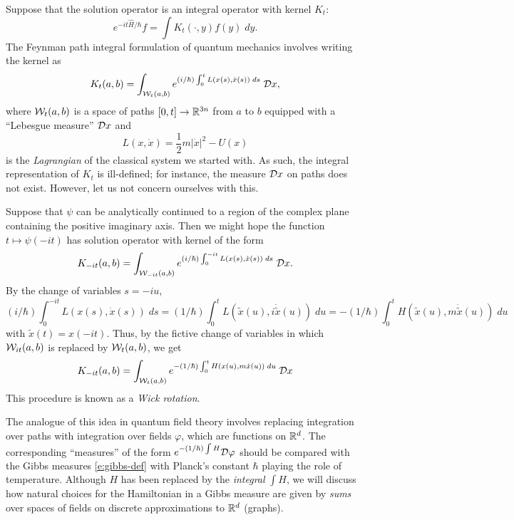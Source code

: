 Suppose that the solution operator is an integral operator with kernel $K_t$:
\begin{equation}
e^{-it\hat H/\hbar} f = \int K_t(\cdot, y) f(y) \; dy.
\end{equation}
The Feynman path integral formulation of quantum mechanics \cite{Feyn48}
involves writing the kernel as
\begin{equation}
K_t(a, b)
	=
\int_{\mathcal{W}_t(a, b)} e^{(i/\hbar) \int_0^t L(x(s), \dot x(s)) \; ds} \; \mathcal{D} x,
\end{equation}
where $\mathcal{W}_t(a, b)$ is a space of paths $[0, t] \rightarrow {\mathbb R}^{3n}$ from
$a$ to $b$ equipped with a ``Lebesgue measure'' $\mathcal{D} x$ and
\begin{equation}
L(x, \dot x) = \frac{1}{2} m |\dot x|^2 - U(x)
\end{equation}
is the \emph{Lagrangian} of the classical system we started with.
As such, the integral representation of $K_t$ is ill-defined;
for instance, the measure $\mathcal{D} x$ on paths does not exist. However, let us
not concern ourselves with this.

Suppose that $\psi$ can be analytically continued to a region of the complex
plane containing the positive imaginary axis. Then we might hope the function
$t \mapsto \psi(-it)$ has solution operator with kernel of the form
\begin{equation}
K_{-it}(a, b)
	=
\int_{\mathcal{W}_{-it}(a, b)} e^{(i/\hbar) \int_0^{-it} L(x(s), \dot x(s)) \; ds} \; \mathcal{D} x.
\end{equation}
By the change of variables $s = -iu$,
\begin{equation}
(i/\hbar) \int_0^{-it} L(x(s), \dot x(s)) \; ds
	=
(1/\hbar) \int_0^t L(\tilde x(u), i \dot{\tilde x}(u)) \; du
	=
-(1/\hbar) \int_0^t H(\tilde x(u), m \dot{\tilde x}(u)) \; du
\end{equation}
with $\tilde x(t) = x(-it)$. Thus, by the fictive change of variables in which
$\mathcal{W}_{it}(a, b)$ is replaced by $\mathcal{W}_t(a, b)$, we get
\begin{equation}
\label{e:heat-kernel-fake}
K_{-it}(a, b)
	=
\int_{\mathcal{W}_t(a, b)} e^{-(1/\hbar) \int_0^t H(x(u), m\dot x(u)) \; du} \; \mathcal{D} x
\end{equation}
This procedure is known as a \emph{Wick rotation}.

The analogue of this idea in quantum field theory involves replacing integration
over paths with integration over fields $\varphi$, which are functions on ${ {{\mathbb R}}^d}$.
The corresponding ``measures'' of the form $e^{-(1/\hbar)\int H} \mathcal{D}\varphi$
should be compared with the Gibbs measures \eqref{e:gibbs-def} with Planck's constant
$\hbar$ playing the role of temperature. Although $H$
has been replaced by the \emph{integral} $\int H$, we will discuss how natural
choices for the Hamiltonian in a Gibbs measure are given by \emph{sums} over
spaces of fields on discrete approximations to ${ {{\mathbb R}}^d}$ (graphs).

